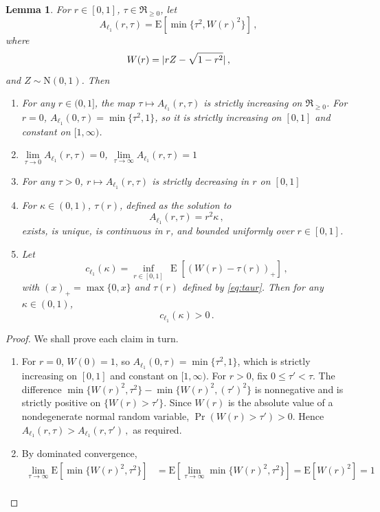 \documentclass{article}
\makeatletter
\DeclareMathOperator{\expect}{E}
\newtheorem{lemma}{Lemma}
\theoremstyle{definition}
\newcommand{\abs}[1]{%
	\ensuremath{%
		\if@display
		\left| #1 \right|
		\else
		\lvert #1 \rvert
		\fi
	}%
}
\makeatother
\begin{document}
\begin{bibunit}
\begin{lemma}\label{lemma:A_ell1_props}
For $r \in [0,1]$, $\tau \in \Re_{\geq 0}$, let
$$
A_{\ell_1}(r, \tau) = \mathrm{E}\left[\min\{\tau^2, W(r)^2 \} \right] \,,
$$
where
$$
W(r) = \abs{rZ - \sqrt{1 - r^2}} \,,
$$
and $Z \sim \mathrm{N}(0,1)$. Then
\begin{enumerate}[label = (\roman{*})]
	\item For any $r\in(0,1]$, the map
	$\tau\mapsto A_{\ell_1}(r,\tau)$ is strictly increasing on
	$\Re_{\geq0}$. For $r=0$,
	$A_{\ell_1}(0,\tau)=\min\{\tau^2,1\}$, so it is strictly increasing
	on $[0,1]$ and constant on $[1,\infty)$.
	\item $\lim\limits_{\tau \to 0} A_{\ell_1}(r, \tau) = 0$, $\lim\limits_{\tau \to \infty} A_{\ell_1}(r, \tau) = 1$
	\item For any $\tau >0 $, $r \mapsto A_{\ell_1}(r,\tau)$ is strictly decreasing in $r$ on $[0,1]$
	\item For $\kappa \in (0,1)$, $\tau(r)$, defined as the solution to
	\begin{equation}
		\label{eq:taur}
		A_{\ell_1}(r, \tau) = r^2 \kappa \,,
	\end{equation}
	exists, is unique, is continuous in $r$, and bounded uniformly over $r \in [0,1]$.
	\item Let
	$$
	c_{\ell_1}(\kappa) = \underset{r \in [0,1]}{\inf} \, \expect[(W(r)-\tau(r))_{+}] \,,
	$$
	with $(x)_+ = \max \{0, x\}$ and $\tau(r)$ defined by \eqref{eq:taur}. Then for any $\kappa \in (0,1)$,
	$$
	c_{\ell_1}(\kappa) > 0 \,.
	$$
\end{enumerate}
\end{lemma}
\begin{proof}
	We shall prove each claim in turn.
	\begin{enumerate}[label=(\roman{*})]
		\item For $r=0$, $W(0)=1$, so
		$A_{\ell_1}(0,\tau)=\min\{\tau^2,1\}$, which is strictly
		increasing on $[0,1]$ and constant on $[1,\infty)$.
		For $r>0$, fix $0\leq\tau'<\tau$. The difference $\min\{W(r)^2,\tau^2\}-\min\{W(r)^2,(\tau')^2\}$
		is nonnegative and is strictly positive on $\{W(r)>\tau'\}$.
		Since $W(r)$ is the absolute value of a nondegenerate normal
		random variable, $\Pr(W(r)>\tau')>0$. Hence $A_{\ell_1}(r,\tau)>A_{\ell_1}(r,\tau') \,,$
		as required.
		\item  By dominated convergence,
        $$
            \begin{aligned}
				\lim\limits_{\tau \to \infty} \mathrm{E}[\min\{W(r)^2, \tau^2\}] &= \mathrm{E}[\lim\limits_{\tau \to \infty} \min\{W(r)^2, \tau^2\}] = \mathrm{E}[W(r)^2] = 1 \\

\end{aligned}$$
\end{enumerate}
\end{proof}
\end{bibunit}
\end{document}
